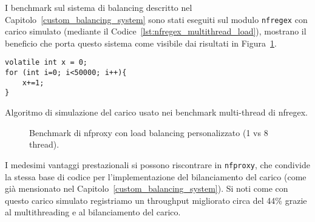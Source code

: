 I benchmark sul sistema di balancing descritto nel Capitolo~\ref{custom_balancing_system} sono stati eseguiti sul modulo \texttt{\gls{nfregex}} con carico simulato (mediante il Codice~\ref{lst:nfregex_multithread_load}), mostrano il beneficio che porta questo sistema come visibile dai risultati in Figura~\ref{fig:nfproxy_multithread_benchmark}.

\begin{listing}[H]
\begin{verbatim}
volatile int x = 0;
for (int i=0; i<50000; i++){
    x+=1;
}
\end{verbatim}
\vspace{-1em}
\caption{Algoritmo di simulazione del carico usato nei benchmark multi-thread di nfregex.}\label{lst:nfregex_multithread_load}
\end{listing}

\begin{figure}[H]
    \centering
    
    \caption{Benchmark di nfproxy con load balancing personalizzato (1 vs 8 thread).}\label{fig:nfproxy_multithread_benchmark}
\end{figure}

I medesimi vantaggi prestazionali si possono riscontrare in \texttt{\gls{nfproxy}}, che condivide la stessa base di codice per l'implementazione del bilanciamento del carico (come già mensionato nel Capitolo~\ref{custom_balancing_system}). Si noti come con questo carico simulato registriamo un throughput migliorato circa del 44\% grazie al multithreading e al bilanciamento del carico.
